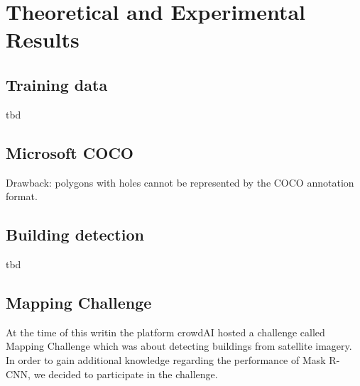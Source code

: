 
\chapter{Theoretical and Experimental Results}
\section{Training data}
tbd

\section{Microsoft COCO}
Drawback: polygons with holes cannot be represented by the COCO annotation format.

\section{Building detection}
tbd

\section{Mapping Challenge}
At the time of this writin the platform crowdAI hosted a challenge called Mapping Challenge \cite{mappingchallenge} which was about detecting buildings from satellite imagery. In order to gain additional knowledge regarding the performance of Mask R-CNN, we decided to participate in the challenge.
		

